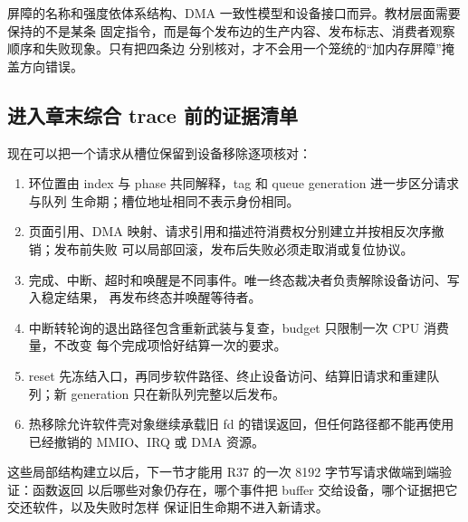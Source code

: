 屏障的名称和强度依体系结构、DMA 一致性模型和设备接口而异。教材层面需要保持的不是某条
固定指令，而是每个发布边的生产内容、发布标志、消费者观察顺序和失败现象。只有把四条边
分别核对，才不会用一个笼统的“加内存屏障”掩盖方向错误。

\subsection{进入章末综合 trace 前的证据清单}

现在可以把一个请求从槽位保留到设备移除逐项核对：

\begin{enumerate}
\item 环位置由 index 与 phase 共同解释，tag 和 queue generation 进一步区分请求与队列
      生命期；槽位地址相同不表示身份相同。
\item 页面引用、DMA 映射、请求引用和描述符消费权分别建立并按相反次序撤销；发布前失败
      可以局部回滚，发布后失败必须走取消或复位协议。
\item 完成、中断、超时和唤醒是不同事件。唯一终态裁决者负责解除设备访问、写入稳定结果，
      再发布终态并唤醒等待者。
\item 中断转轮询的退出路径包含重新武装与复查，budget 只限制一次 CPU 消费量，不改变
      每个完成项恰好结算一次的要求。
\item reset 先冻结入口，再同步软件路径、终止设备访问、结算旧请求和重建队列；新 generation
      只在新队列完整以后发布。
\item 热移除允许软件壳对象继续承载旧 fd 的错误返回，但任何路径都不能再使用已经撤销的
      MMIO、IRQ 或 DMA 资源。
\end{enumerate}

这些局部结构建立以后，下一节才能用 R37 的一次 8192 字节写请求做端到端验证：函数返回
以后哪些对象仍存在，哪个事件把 buffer 交给设备，哪个证据把它交还软件，以及失败时怎样
保证旧生命期不进入新请求。
